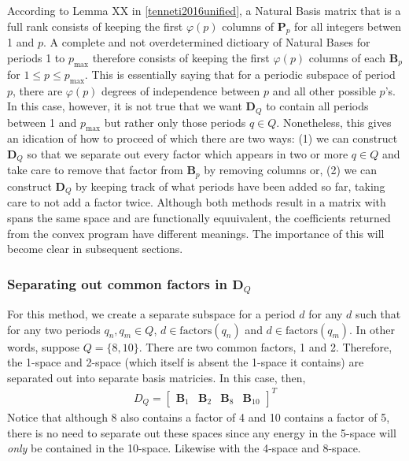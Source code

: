     According to Lemma XX in \ref{tenneti2016unified}, a Natural Basis matrix that is a full rank consists of keeping the first $\varphi(p)$ columns of $\bm{P}_p$ for all integers betwen 1 and $p$. A complete and not overdetermined dictioary of Natural Bases for periods 1 to $p_{\text{max}}$ therefore consists of keeping the first $\varphi(p)$ columns of each $\bm{B}_p$ for $1 \leq p \leq p_{\text{max}}$. This is essentially saying that for a periodic subspace of period $p$, there are $\varphi(p)$ degrees of independence between $p$ and all other possible $p$'s. In this case, however, it is not true that we want $\bm{D}_Q$ to contain all periods between 1 and $p_{\text{max}}$ but rather only those periods $q \in Q$.
     Nonetheless, this gives an idication of how to proceed of which there are two ways: (1) we can construct $\bm{D}_Q$ so that we separate out every factor which appears in two or more $q \in Q$ and take care to remove that factor from $\bm{B}_p$ by removing columns or, (2) we can construct $\bm{D}_Q$ by keeping track of what periods have been added so far, taking care to not add a factor twice. Although both methods result in a matrix with spans the same space and are functionally equuivalent, the coefficients returned from the convex program have different meanings. The importance of this will become clear in subsequent sections.

        \subsubsection{Separating out common factors in $\bm{D}_Q$}\label{detection:A:separateFactors}
        For this method, we create a separate subspace for a period $d$ for any $d$ such that for any two periods $q_n, q_m \in Q$, $d \in \text{factors}(q_n)$ and $d \in \text{factors}(q_m)$. In other words, suppose $Q = \{8, 10\}$. There are two common factors, 1 and 2. Therefore, the 1-space and 2-space (which itself is absent the 1-space it contains) are separated out into separate basis matricies. In this case, then,
        \begin{align*}
            D_Q = \begin{bmatrix}
                \bm{B}_{1} & \bm{B}_{2} & \bm{B}_{8} & \bm{B}_{10}
            \end{bmatrix}^{T}
        \end{align*}
        Notice that although 8 also contains a factor of 4 and 10 contains a factor of 5, there is no need to separate out these spaces since any energy in the 5-space will \emph{only} be contained in the 10-space. Likewise with the 4-space and 8-space.

